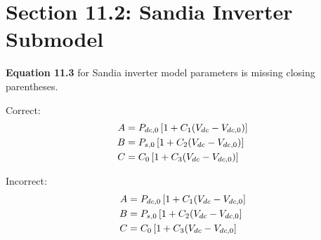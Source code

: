 \documentclass[report]{nrel}
\begin{document}
\section*{Section 11.2: Sandia Inverter Submodel}

\textbf{Equation 11.3} for Sandia inverter model parameters is missing closing parentheses.

Correct:
\begin{align*}
A &=P_{dc,0} \left[ 1+ C_1 ( V_{dc} - V_{dc,0} )\right] \notag\\
B &= P_{s,0}  \left[ 1+ C_2 ( V_{dc} - V_{dc,0} )\right] \notag\\
C &= C_0  \left[ 1+ C_3 ( V_{dc} - V_{dc,0} )\right]
\end{align*}

Incorrect:
\begin{align*}
A &=P_{dc,0} \left[ 1+ C_1 ( V_{dc} - V_{dc,0}\right] \notag\\
B &= P_{s,0}  \left[ 1+ C_2 ( V_{dc} - V_{dc,0}\right] \notag\\
C &= C_0  \left[ 1+ C_3 ( V_{dc} - V_{dc,0}\right]
\end{align*}
\end{document}
